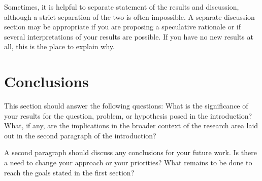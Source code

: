 \documentclass[11pt]{article}
\begin{document}
Sometimes, it is helpful to separate statement of the results and
discussion, although a strict separation of the two is often
impossible. A separate discussion section may be appropriate if you are
proposing a speculative rationale or if several interpretations of your
results are possible. If you have no new results at all, this is the
place to explain why. 

\section{Conclusions}


This section should answer the following questions:
What is the significance of your results for the question, problem, or
hypothesis posed in the introduction? What, if any, are the
implications in the broader context of the research area laid out in the
second paragraph of the introduction? 

A second paragraph should discuss any conclusions for your future work. 
Is there a need to change your approach or your priorities? What remains
to be done to reach the goals stated in the first section? 

\printbibliography
\end{document}
